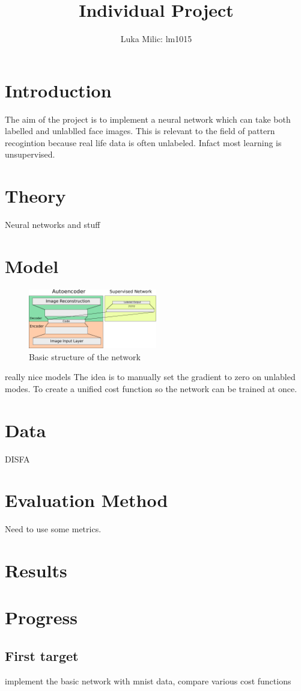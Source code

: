 \documentclass[11pt]{article}
\title{Individual Project}
\author{Luka Milic: lm1015}
\begin{document}
\maketitle
\section{Introduction}
The aim of the project is to implement a neural network which can take both labelled and unlablled face images.
This is relevant to the field of pattern recogintion because real life data is often unlabeled. Infact most learning is unsupervised.
\section{Theory}
Neural networks and stuff
\section{Model}
\begin{figure}
  \begin{center}
    \includegraphics[width=0.5\textwidth]{illustrations/network_01.pdf}
  \end{center}
  \caption{Basic structure of the network}
\end{figure}
really nice models
The idea is to manually set the gradient to zero on unlabled modes. To create a unified cost function so the network can be trained at once.
\section{Data}
DISFA
\section{Evaluation Method}
Need to use some metrics.
\section{Results}
\section{Progress}
\subsection{First target}
implement the basic network with mnist data, compare various cost functions
\end{document}
